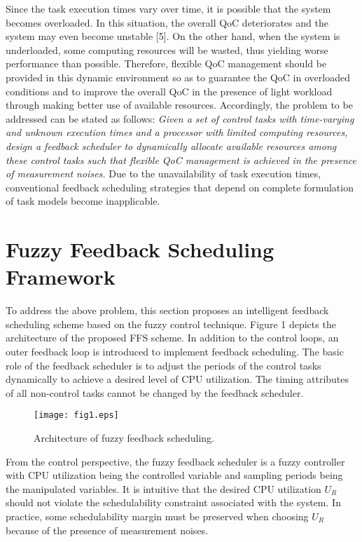 \documentclass[12pt,a4paper]{ijicic}
\begin{document}
Since the task execution times vary over time, it is possible that
the system becomes overloaded. In this situation, the overall QoC
deteriorates and the system may even become unstable [5]. On the
other hand, when the system is underloaded, some computing resources will be
wasted, thus yielding worse performance than possible. Therefore,
flexible QoC management should be provided in this dynamic
environment so as to guarantee the QoC in overloaded conditions and
to improve the overall QoC in the presence of light workload through
making better use of available resources. Accordingly, the problem
to be addressed can be stated as follows: \emph{Given a set of
control tasks with time-varying and unknown execution times and a
processor with limited computing resources, design a feedback
scheduler to dynamically allocate available resources among these
control tasks such that flexible QoC management is achieved in the
presence of measurement noises.} Due to the unavailability of task
execution times, conventional feedback scheduling strategies that
depend on complete formulation of task models become inapplicable.

\section{Fuzzy Feedback Scheduling Framework}
\label{sec:3}

To address the
above problem, this section proposes an intelligent feedback
scheduling scheme based on the fuzzy control technique. Figure 1
depicts the architecture of the proposed FFS scheme. In addition to
the control loops, an outer feedback loop is introduced to implement
feedback scheduling. The basic role of the feedback scheduler is to
adjust the periods of the control tasks dynamically to achieve a
desired level of CPU utilization. The timing attributes of all
non-control tasks cannot be changed by the feedback scheduler.

\begin{figure}[htbp!]
\centering
\texttt{[image: fig1.eps]}
\caption{Architecture of fuzzy feedback scheduling.}
\label{fig1}
\end{figure}

From the control perspective, the fuzzy feedback scheduler is a
fuzzy controller with CPU utilization being the controlled variable
and sampling periods being the manipulated variables. It is
intuitive that the desired CPU utilization $U_R$ should not violate
the schedulability constraint associated with the system. In
practice, some schedulability margin must be preserved when choosing
$U_R$ because of the presence of measurement noises.
\end{document}
